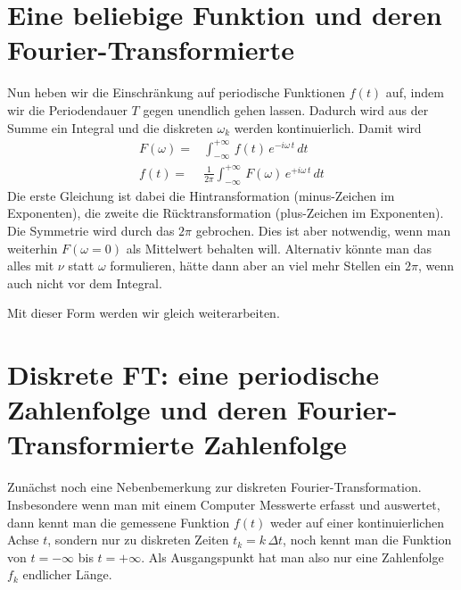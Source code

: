 \section{Eine beliebige Funktion und deren Fourier-Transformierte}

Nun heben wir die Einschränkung auf periodische Funktionen $f(t)$ auf, indem wir die Periodendauer $T$ gegen unendlich gehen lassen. Dadurch wird aus der Summe ein Integral und die diskreten $\omega_k$ werden kontinuierlich. Damit wird
\begin{align}
 F(\omega) = & \int_{-\infty}^{+\infty} \, f(t) \, e^{- i \omega\, t} \, dt \\
 f(t) = & \frac{1}{2 \pi } \int_{-\infty}^{+\infty} \, F(\omega) \, e^{+ i \omega\, t} \, dt 
\end{align}
Die erste Gleichung ist dabei die Hintransformation (minus-Zeichen im Exponenten), die zweite die Rücktransformation (plus-Zeichen im Exponenten). Die Symmetrie wird durch das $2 \pi$ gebrochen. Dies ist aber notwendig, wenn man weiterhin $F(\omega = 0)$ als Mittelwert behalten will. Alternativ könnte man das alles mit $\nu$ statt $\omega$  formulieren, hätte dann aber an viel mehr Stellen ein $2 \pi$, wenn auch nicht vor dem Integral.

Mit dieser Form werden wir gleich weiterarbeiten.

\section{Diskrete FT: eine periodische Zahlenfolge und deren Fourier-Transformierte Zahlenfolge}

Zunächst noch eine Nebenbemerkung zur diskreten Fourier-Transformation. Insbesondere wenn man mit einem Computer Messwerte erfasst und auswertet, dann kennt man die gemessene Funktion $f(t)$ weder auf einer kontinuierlichen Achse $t$, sondern nur zu diskreten Zeiten $t_k = k \, \Delta t$, noch kennt man die Funktion von $t = - \infty$ bis $t = + \infty$. Als Ausgangspunkt hat man also nur eine Zahlenfolge $f_k$ endlicher Länge.

